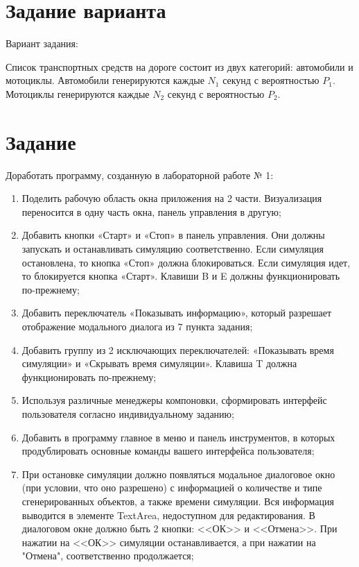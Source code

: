 \documentclass{article}
\begin{document}
\section*{Задание варианта}

Вариант задания:

Список транспортных средств на дороге состоит из двух категорий: автомобили и мотоциклы. Автомобили генерируются каждые $N_{1}$ секунд с вероятностью $P_{1}$. Мотоциклы генерируются каждые $N_{2}$ секунд с вероятностью $P_{2}$.

\section*{Задание}

Доработать программу, созданную в лабораторной работе № 1:
\begin{enumerate}

\item Поделить рабочую область окна приложения на 2 части. Визуализация переносится в одну часть окна, панель управления в другую;

\item Добавить кнопки «Старт» и «Стоп» в панель управления. Они должны запускать и останавливать симуляцию соответственно. Если симуляция остановлена, то кнопка «Стоп» должна блокироваться. Если симуляция идет, то блокируется кнопка «Старт». Клавиши B и E должны функционировать по-прежнему;

\item Добавить переключатель «Показывать информацию», который разрешает отображение модального диалога из 7 пункта задания;

\item Добавить группу из 2 исключающих переключателей: «Показывать время симуляции» и «Скрывать время симуляции». Клавиша T должна функционировать по-прежнему;

\item Используя различные менеджеры компоновки, сформировать интерфейс пользователя согласно индивидуальному заданию;

\item Добавить в программу главное в меню и панель инструментов, в которых продублировать основные команды вашего интерфейса пользователя;

\item При остановке симуляции должно появляться модальное диалоговое окно (при условии, что оно разрешено) с информацией о количестве и типе сгенерированных объектов, а также времени симуляции. Вся информация выводится в элементе TextArea, недоступном для редактирования. В диалоговом окне должно быть 2 кнопки: <<ОК>> и <<Отмена>>. При нажатии на <<ОК>> симуляции останавливается, а при нажатии на "Отмена", соответственно продолжается;


\end{enumerate}
\end{document}
